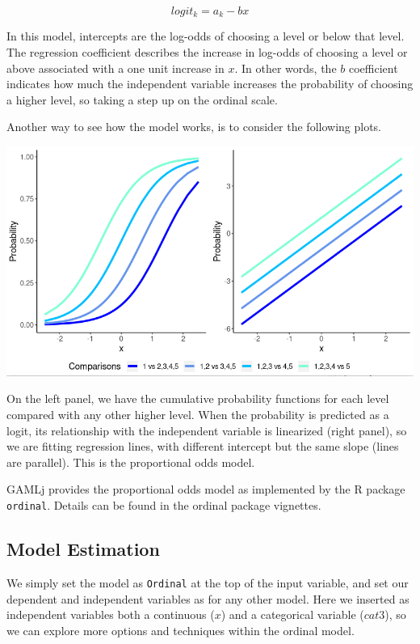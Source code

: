 \documentclass[
]{book}
\begin{document}
\[
logit_k=a_k-b x
\]

In this model, intercepts are the log-odds of choosing a level or below that level. The regression coefficient describes the increase in log-odds of choosing a level or above associated with a one unit increase in \(x\). In other words, the \(b\) coefficient indicates how much the independent variable increases the probability of choosing a higher level, so taking a step up on the ordinal scale.

Another way to see how the model works, is to consider the following plots.

\includegraphics{bookletpics/3_ordinal_probs.png}

On the left panel, we have the cumulative probability functions for each level compared with any other higher level. When the probability is predicted as a logit, its relationship with the independent variable is linearized (right panel), so we are fitting regression lines, with different intercept but the same slope (lines are parallel). This is the proportional odds model.

{GAMLj} provides the proportional odds model as implemented by the R package \texttt{ordinal}. Details can be found in the ordinal package vignettes.

\hypertarget{model-estimation-2}{%
\subsection{Model Estimation}\label{model-estimation-2}}

We simply set the model as \texttt{Ordinal} at the top of the input variable, and set our dependent and independent variables as for any other model. Here we inserted as independent variables both a continuous (\(x\)) and a categorical variable (\(cat3\)), so we can explore more options and techniques within the ordinal model.
\end{document}
